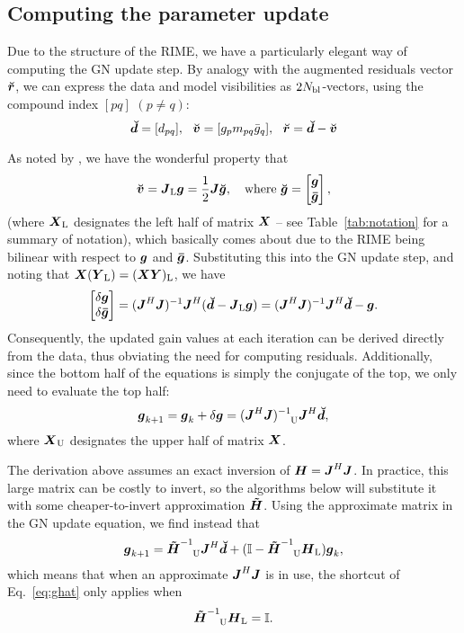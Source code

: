 \documentclass[useAMS,usenatbib]{mn2e}
\makeatletter
\newcommand{\II}{\mathbb{I}}
\newcommand{\vecg}{\bmath{g}}
\newcommand{\vecgc}{\bmath{\bar g}}
\newcommand{\mat}[1]{{\bmath{#1}}}
\newcommand{\JJ}{\mat{J}} %
\newcommand{\HH}{\mat{H}} %
\newcommand{\HHa}{\mat{\tilde{H}}} %
\newcommand{\JHJ}{\JJ^H\JJ} %
\newcommand{\Matrix}[2]{\left [ \begin{array}{@{}#1@{}}#2\end{array} \right ]}
\newcommand{\AUG}[1]{\bmath{\breve{#1}}}
\newcommand{\Gg}{\AUG{g}}
\newcommand{\Rr}{\AUG{r}}
\newcommand{\Dd}{\AUG{d}}
\newcommand{\Vv}{\AUG{v}}
\newcommand{\TOP}{\mathrm{U}}%
\newcommand{\LEFT}{\mathrm{L}}
\numberwithin{equation}{section}
\makeatother
\begin{document}
\subsection{Computing the parameter update}

Due to the structure of the RIME, we have a particularly elegant way of computing the GN update step.
By analogy with the augmented residuals vector $\Rr$, we can express the data and model visibilities 
as $2N_\mathrm{bl}$-vectors,
using the compound index $[pq]$ $(p\ne q)$:
\begin{equation}
\Dd = [ d_{pq} ],~~\Vv = [ g_p m_{pq} \bar{g}_q ],~~\Rr =\Dd-\Vv
\end{equation}

As noted by \citet{Tasse-cohjones}, we have the wonderful property that
\begin{equation}
\label{eq:v_Jg}
\Vv = \JJ_\LEFT \bmath{g}  = \frac{1}{2}\JJ \Gg,~~~\mathrm{where}~\Gg = \Matrix{c}{\bmath{g} \\ \bmath{\bar g}},
\end{equation}
(where $\bmath{X}_\LEFT$ designates the left half of matrix $\bmath{X}$ -- see Table~\ref{tab:notation} for a summary of notation),
which basically comes about due to the RIME being bilinear with respect to $\bmath{g}$ and $\bmath{\bar g}$. 
Substituting this into the GN update step, and noting that $\bmath{X}(\bmath{Y}_\LEFT) = (\bmath{XY})_\LEFT$, 
we have 
\begin{equation}
\Matrix{c}{\delta\vecg\\\delta\vecgc} = (\JHJ)^{-1} \JJ^H (\Dd - \JJ_\LEFT \vecg) = (\JHJ)^{-1} \JJ^H \Dd - \vecg.
\end{equation}
Consequently, the updated gain values at each iteration can be derived directly from the data, thus obviating the need
for computing residuals. Additionally, since the bottom half of the equations is simply the conjugate of the top, 
we only need to evaluate the top half:
\begin{equation}
\label{eq:ghat}
\vecg_{k+1} = \vecg_k + \delta\vecg = (\JHJ)^{-1}_{~~~\TOP} \JJ^H \Dd,
\end{equation}
where $\bmath{X}_\TOP$ designates the upper half of matrix $\bmath{X}$. 

The derivation above assumes an exact inversion of $\HH=\JHJ$. In practice, this large matrix can be costly to invert, 
so the algorithms below will substitute it with some cheaper-to-invert approximation $\HHa$. Using the approximate
matrix in the GN update equation, we find instead that
\begin{equation}
\label{eq:ghat:approx}
\vecg_{k+1} = \HHa^{-1}_{~~~\TOP} \JJ^H \Dd + (\II - \HHa^{-1}_{~~~\TOP} \HH_\LEFT )\vecg_k,
\end{equation}
which means that when an approximate $\JHJ$ is in use, the shortcut of Eq.~\ref{eq:ghat} only applies when 
\begin{equation}
\label{eq:ghat:precise}
\HHa^{-1}_{~~~\TOP} \HH_\LEFT=\II.
\end{equation}
\end{document}
